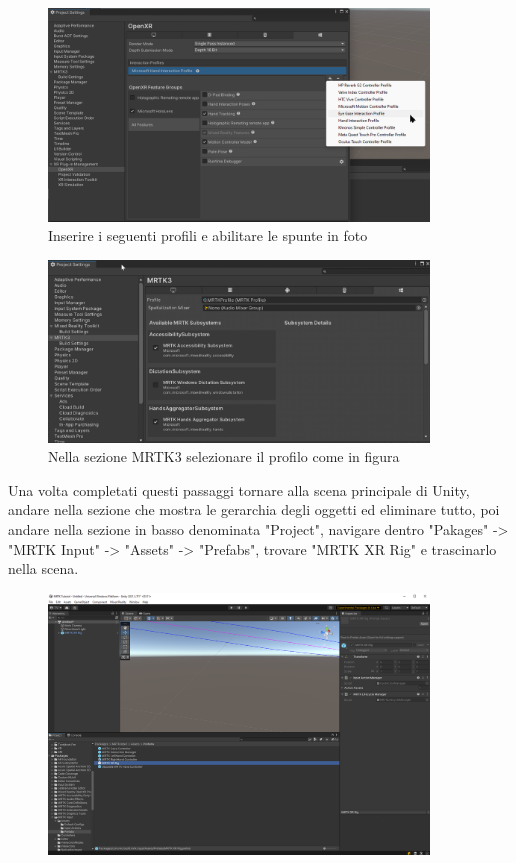 \begin{figure}[H]
    \centering
    \includegraphics[width=0.9\textwidth,height=\textheight,keepaspectratio]{figures/chapter_1/projectSetting4.png}
    \caption{Inserire i seguenti profili e abilitare le spunte in foto}
\end{figure}
\begin{figure}[H]
    \centering
    \includegraphics[width=0.9\textwidth,height=\textheight,keepaspectratio]{figures/chapter_1/projectSetting5.png}
    \caption{Nella sezione MRTK3 selezionare il profilo come in figura}
\end{figure}
Una volta completati questi passaggi tornare alla scena principale di Unity, andare nella sezione che mostra le gerarchia degli oggetti ed eliminare tutto, poi andare nella sezione in basso denominata "Project", navigare dentro "Pakages" -> "MRTK Input" -> "Assets" -> "Prefabs", trovare "MRTK XR Rig" e trascinarlo nella scena.
\begin{figure}[H]
    \centering
    \includegraphics[width=0.9\textwidth,height=\textheight,keepaspectratio]{figures/chapter_1/mrtk-xr-rig-prefab.png}
    \caption{}
\end{figure}
